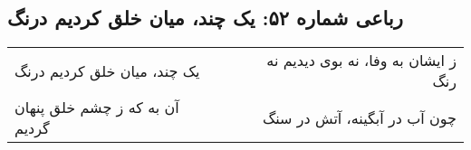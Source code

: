 \begin{center}
\section*{رباعی شماره ۵۲: یک چند، میان خلق کردیم درنگ}
\label{sec:052}
\begin{longtable}{l p{0.5cm} r}
یک چند، میان خلق کردیم درنگ
&&
ز ایشان به وفا، نه بوی دیدیم نه رنگ
\\
آن به که ز چشم خلق پنهان گردیم
&&
چون آب در آبگینه، آتش در سنگ
\\
\end{longtable}
\end{center}
